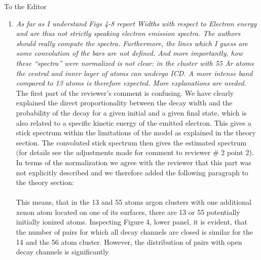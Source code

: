 \documentclass[DIN,pagenumber=false,parskip=half,fromalign=left,fromphone=true,fromemail=true,fromurl=false,fromlogo=false,fromrule=false]{scrlttr2}
\begin{document}
\begin{letter}{To the Editor}
\begin{enumerate}
  \item \emph{As far as I understand Figs 4-8 report Widths with respect to Electron energy and are thus not strictly speaking electron emission spectra. The authors should really compute the spectra. Furthermore, the lines which I guess are some convolution of the bars are not defined. And more importantly, how these “spectra” were normalized is not clear: in the cluster with 55 Ar atoms the central and inner layer of atoms can undergo ICD. A more intense band compared to 13 atoms is therefore expected. More explanations are needed.}\vspace{0.3cm}\\
        The first part of the reviewer's comment is confusing. We have clearly
        explained the direct proportionality between the decay width and
        the probability of the decay for a given initial and a given final state,
        which is also related to a specific kinetic energy of the emitted
        electron. This gives a stick spectrum within the limitations
        of the model as explained in the theory section. The convoluted stick
        spectrum then gives the estimated spectrum
        (for details see the adjustments made for
        comment to reviewer \# 2 point 2).\\
        In terms of the normalization we agree with the reviewer that this part
        was not explicitly described and we therefore added the following
        paragraph to the theory section:\\
        {\color{blue}{The decay width for the total system is in the end
        normalized to the decay width
        per initially ionized atom since we are interested in the events
        after one ionization which could be located at any of the atoms of
        the corresponding atom
        type. We thereby yield an averaged decay width for the cluster structure.
        This step allows the comparison of the total average decay widths
        between cluster structures of different size and composition.}}
        \vspace{0.3cm}\\
        This means, that in the 13 and 55 atoms argon clusters with one
        additional xenon atom
        located on one of its surfaces, there are 13 or 55 potentially
        initially ionized atoms. Inspecting Figure 4, lower panel, it is
        evident, that the number of pairs for which all decay channels are
        closed is similar for the 14 and the 56 atom cluster. However,
        the distribution of pairs with open decay channels is significantly

\end{enumerate}
\end{letter}
\end{document}
